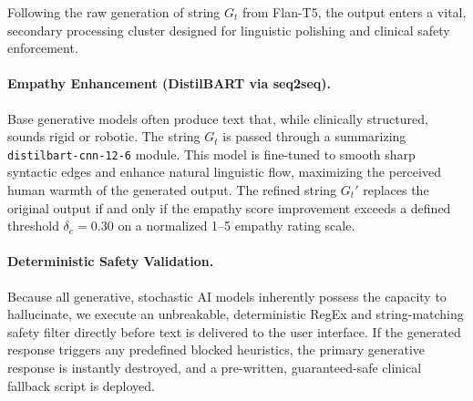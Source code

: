 \documentclass[12pt,twoside]{article}
\begin{document}
Following the raw generation of string $G_t$ from Flan-T5, the output enters a vital, secondary processing cluster designed for linguistic polishing and clinical safety enforcement.

\paragraph{Empathy Enhancement (DistilBART via seq2seq).}
Base generative models often produce text that, while clinically structured, sounds rigid or robotic. The string $G_t$ is passed through a summarizing \texttt{distilbart-cnn-12-6} module. This model is fine-tuned to smooth sharp syntactic edges and enhance natural linguistic flow, maximizing the perceived human warmth of the generated output. The refined string $G_t'$ replaces the original output if and only if the empathy score improvement exceeds a defined threshold $\delta_e = 0.30$ on a normalized 1--5 empathy rating scale.

\paragraph{Deterministic Safety Validation.}
Because all generative, stochastic AI models inherently possess the capacity to hallucinate, we execute an unbreakable, deterministic RegEx and string-matching safety filter directly before text is delivered to the user interface. If the generated response triggers any predefined blocked heuristics, the primary generative response is instantly destroyed, and a pre-written, guaranteed-safe clinical fallback script is deployed.
\end{document}
